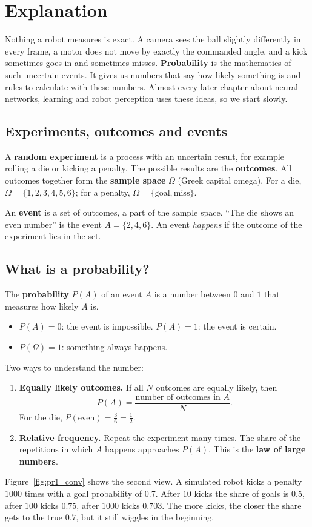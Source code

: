 \label{ch:prob}

\section*{Explanation}
Nothing a robot measures is exact. A camera sees the ball slightly differently in every frame, a motor does not move by exactly the commanded angle, and a kick sometimes goes in and sometimes misses. \textbf{Probability} is the mathematics of such uncertain events. It gives us numbers that say how likely something is and rules to calculate with these numbers. Almost every later chapter about neural networks, learning and robot perception uses these ideas, so we start slowly.

\subsection*{Experiments, outcomes and events}
A \textbf{random experiment} is a process with an uncertain result, for example rolling a die or kicking a penalty. The possible results are the \textbf{outcomes}. All outcomes together form the \textbf{sample space} $\Omega$ (Greek capital omega). For a die, $\Omega=\{1,2,3,4,5,6\}$; for a penalty, $\Omega=\{\text{goal},\text{miss}\}$.

An \textbf{event} is a set of outcomes, a part of the sample space. ``The die shows an even number'' is the event $A=\{2,4,6\}$. An event \emph{happens} if the outcome of the experiment lies in the set.

\subsection*{What is a probability?}
The \textbf{probability} $P(A)$ of an event $A$ is a number between $0$ and $1$ that measures how likely $A$ is.
\begin{itemize}[nosep]
  \item $P(A)=0$: the event is impossible. $P(A)=1$: the event is certain.
  \item $P(\Omega)=1$: something always happens.
\end{itemize}
Two ways to understand the number:
\begin{enumerate}[nosep]
  \item \textbf{Equally likely outcomes.} If all $N$ outcomes are equally likely, then
  \[
  P(A)=\frac{\text{number of outcomes in }A}{N}.
  \]
  For the die, $P(\text{even})=\frac{3}{6}=\frac12$.
  \item \textbf{Relative frequency.} Repeat the experiment many times. The share of the repetitions in which $A$ happens approaches $P(A)$. This is the \textbf{law of large numbers}.
\end{enumerate}
Figure~\ref{fig:pr1_conv} shows the second view. A simulated robot kicks a penalty $1000$ times with a goal probability of $0.7$. After $10$ kicks the share of goals is $0.5$, after $100$ kicks $0.75$, after $1000$ kicks $0.703$. The more kicks, the closer the share gets to the true $0.7$, but it still wiggles in the beginning.


